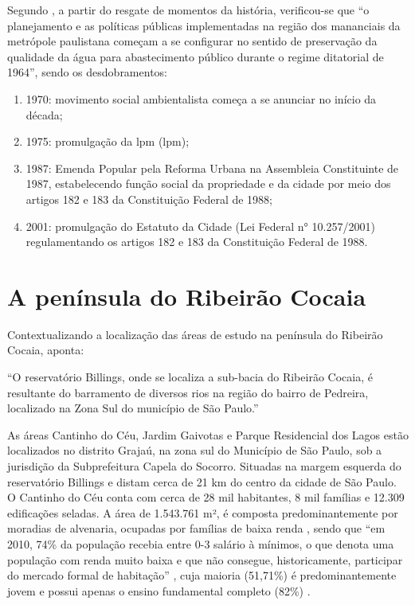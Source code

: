 	Segundo , a partir do resgate de momentos da história, verificou-se que ``o planejamento e as políticas públicas implementadas na região dos mananciais da metrópole paulistana começam a se configurar no sentido de preservação da qualidade da água para abastecimento público durante o regime ditatorial de 1964'', sendo os desdobramentos:
	
	\begin{enumerate}
		\item 1970: movimento social ambientalista começa a se anunciar no início da década;
		\item 1975: promulgação da \glsdesc{lpm} (\gls{lpm});
		\item 1987: Emenda Popular pela Reforma Urbana na Assembleia Constituinte de 1987, estabelecendo função social da propriedade e da cidade por meio dos artigos 182 e 183 da Constituição Federal de 1988;
		\item 2001: promulgação do Estatuto da Cidade (Lei Federal n° 10.257/2001) regulamentando os artigos 182 e 183 da Constituição Federal de 1988.
	\end{enumerate}

	\section{A península do Ribeirão Cocaia} \label{peninsula}
	
	Contextualizando a localização das áreas de estudo na península do Ribeirão Cocaia,  aponta:
	
	\begin{citacao}
		``O reservatório Billings, onde se localiza a sub-bacia do Ribeirão Cocaia, é 	resultante do barramento de diversos rios na região do bairro de Pedreira, localizado na Zona Sul do município de São Paulo.''
	\end{citacao}
	
	As áreas Cantinho do Céu, Jardim Gaivotas e Parque Residencial dos Lagos estão localizados no distrito Grajaú, na zona sul do Município de São Paulo, sob a jurisdição da Subprefeitura Capela do Socorro. Situadas na margem esquerda do reservatório Billings e distam cerca de 21 km do centro da cidade de São Paulo. O Cantinho do Céu conta com cerca de 28 mil habitantes, 8 mil famílias e 12.309 edificações seladas. A área de 1.543.761 m², é composta predominantemente por moradias de alvenaria, ocupadas por famílias de baixa renda \cite{Barda2012}, sendo que ``em 2010, 74\% da população recebia entre 0-3 salário à mínimos, o que denota uma população com renda muito baixa e que não consegue, historicamente, participar do mercado formal de habitação'' \cite[p.116]{Silva2016}, cuja maioria (51,71\%) é predominantemente jovem e possui apenas o ensino fundamental completo (82\%) \cite[p.116]{Silva2016}.

